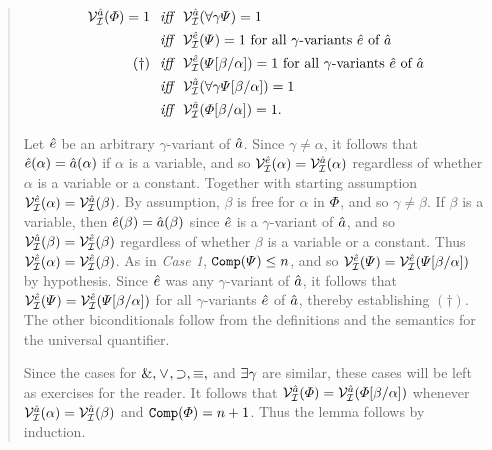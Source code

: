 \begin{quote}
  \vspace{-.2in}
  \begin{align*}
    \mathcal{V}_{\mathcal{I}}^{\hat{a}}(\varPhi)=1 &\textit{ ~iff~ } \mathcal{V}_{\mathcal{I}}^{\hat{a}}(\forall \gamma\varPsi)=1\\
      &\textit{ ~iff~ } \mathcal{V}_{\mathcal{I}}^{\hat{e}}(\varPsi)=1 \text{ for all } \gamma\text{-variants } \hat{e} \text{ of } \hat{a}\\ 
      (\dagger) &\textit{ ~iff~ } \mathcal{V}_{\mathcal{I}}^{\hat{e}}(\varPsi[\beta/\alpha])=1 \text{ for all } \gamma\text{-variants } \hat{e} \text{ of } \hat{a}\\  
      &\textit{ ~iff~ } \mathcal{V}_{\mathcal{I}}^{\hat{a}}(\forall \gamma\varPsi[\beta/\alpha])=1\\ 
      &\textit{ ~iff~ } \mathcal{V}_{\mathcal{I}}^{\hat{a}}(\varPhi[\beta/\alpha])=1.
  \end{align*}

  Let $\hat{e}$ be an arbitrary $\gamma$-variant of $\hat{a}$.
  Since $\gamma\neq\alpha$, it follows that $\hat{e}(\alpha)=\hat{a}(\alpha)$ if $\alpha$ is a variable, and so $\mathcal{V}_{\mathcal{I}}^{\hat{e}}(\alpha)=\mathcal{V}_{\mathcal{I}}^{\hat{a}}(\alpha)$ regardless of whether $\alpha$ is a variable or a constant.
  Together with starting assumption $\mathcal{V}_{\mathcal{I}}^{\hat{e}}(\alpha)=\mathcal{V}_{\mathcal{I}}^{\hat{a}}(\beta)$.
  By assumption, $\beta$ is free for $\alpha$ in $\varPhi$, and so $\gamma\neq\beta$.
  If $\beta$ is a variable, then $\hat{e}(\beta)=\hat{a}(\beta)$ since $\hat{e}$ is a $\gamma$-variant of $\hat{a}$, and so $\mathcal{V}_{\mathcal{I}}^{\hat{a}}(\beta)=\mathcal{V}_{\mathcal{I}}^{\hat{e}}(\beta)$ regardless of whether $\beta$ is a variable or a constant.
  Thus $\mathcal{V}_{\mathcal{I}}^{\hat{e}}(\alpha)=\mathcal{V}_{\mathcal{I}}^{\hat{e}}(\beta)$.
  As in \textit{Case 1}, $\texttt{Comp}(\varPsi)\leq n$, and so $\mathcal{V}_{\mathcal{I}}^{\hat{e}}(\varPsi)=\mathcal{V}_{\mathcal{I}}^{\hat{e}}(\varPsi[\beta/\alpha])$ by hypothesis.
  Since $\hat{e}$ was any $\gamma$-variant of $\hat{a}$, it follows that $\mathcal{V}_{\mathcal{I}}^{\hat{e}}(\varPsi)=\mathcal{V}_{\mathcal{I}}^{\hat{e}}(\varPsi[\beta/\alpha])$ for all $\gamma$-variants $\hat{e}$ of $\hat{a}$, thereby establishing $(\dagger)$.
  The other biconditionals follow from the definitions and the semantics for the universal quantifier.

  Since the cases for $\mathrel\&,\mkern1mu\vee\mkern1mu,\supset,\equiv,$ and $\exists \gamma$ are similar, these cases will be left as exercises for the reader.
  It follows that $\mathcal{V}_{\mathcal{I}}^{\hat{a}}(\varPhi)=\mathcal{V}_{\mathcal{I}}^{\hat{a}}(\varPhi[\beta/\alpha])$ whenever $\mathcal{V}_{\mathcal{I}}^{\hat{a}}(\alpha)=\mathcal{V}_{\mathcal{I}}^{\hat{a}}(\beta)$ and $\texttt{Comp}(\varPhi)=n+1$.
  Thus the lemma follows by induction.
\end{quote}


